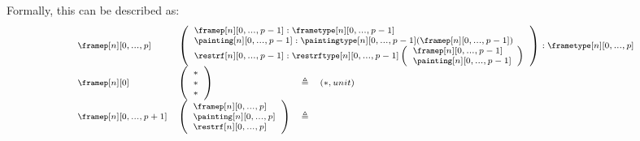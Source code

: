\documentclass{msc}
\newcommand{\unitpoint}{\ensuremath{\ast}}
\newcommand{\defeq}{\ensuremath{\triangleq}}
\begin{document}
Formally, this can be described as:
\begin{equation*}
  \fontsize{7.2}{9}\selectfont
  \begin{array}{llcl}
    \framep[n][0,...,p]                                                           &
    \multicolumn{3}{l}{
      \left(\begin{array}{l}
                \framep[n][0,...,p-1]:\frametype[n][0,...,p-1]                             \\
                \painting[n][0,...,p-1]:\paintingtype[n][0,...,p-1](\framep[n][0,...,p-1]) \\
                \restrf[n][0,...,p-1]:\restrftype[n][0,...,p-1]
                \left(\begin{array}{l}
                    \framep[n][0,...,p-1]   \\
                    \painting[n][0,...,p-1] \\
                  \end{array}\right)                                              \\
              \end{array}\right) : \frametype[n][0,...,p]
    }                                                                                                                                                                                                   \\
    \framep[n][0]                                                                 &
    \left(\begin{array}{l}
              \unitpoint \\
              \unitpoint \\
              \unitpoint \\
            \end{array}\right)                                                        & \defeq                                       & (\unitpoint,unit)                                                  \\
    \framep[n][0,...,p+1]                                                         &
    \left(\begin{array}{l}
              \framep[n][0,...,p]   \\
              \painting[n][0,...,p] \\
              \restrf[n][0,...,p]   \\
            \end{array}\right)                                                      & \defeq                                       &

\end{array}
\end{equation*}
\end{document}
